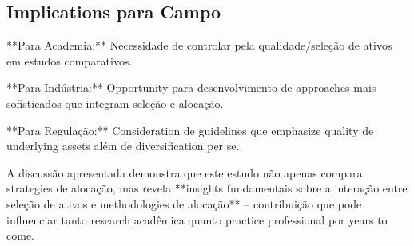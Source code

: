 \subsection{Implications para Campo}

**Para Academia:** Necessidade de controlar pela qualidade/seleção de ativos em estudos comparativos.

**Para Indústria:** Opportunity para desenvolvimento de approaches mais sofisticados que integram seleção e alocação.

**Para Regulação:** Consideration de guidelines que emphasize quality de underlying assets além de diversification per se.

A discussão apresentada demonstra que este estudo não apenas compara strategies de alocação, mas revela **insights fundamentais sobre a interação entre seleção de ativos e methodologies de alocação** – contribuição que pode influenciar tanto research acadêmica quanto practice professional por years to come.